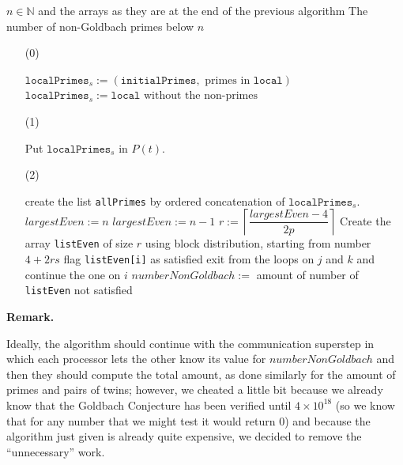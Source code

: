 \documentclass[a4paper,11pt]{article}
\newcommand{\N}{\mathbb{N}}
\begin{document}
\begin{algorithm}[H]
\begin{algorithmic}
\REQUIRE $n \in \N$ and the arrays as they are at the end of the previous algorithm
\ENSURE The number of non-Goldbach primes below $n$
\end{algorithmic}

\begin{enumerate}
\item[(0)] \begin{algorithmic}
\STATE $\texttt{localPrimes}_s := (\texttt{initialPrimes},\mbox{ primes in }\texttt{local})$
\ELSE
\STATE $\texttt{localPrimes}_s := \texttt{local} \mbox{ without the non-primes}$
\ENDIF
\end{algorithmic}

\item[(1)] \begin{algorithmic}
\STATE Put $\texttt{localPrimes}_s$ in $P(t)$.
\ENDFOR
\end{algorithmic}

\item[(2)] \begin{algorithmic}
\STATE create the list \texttt{allPrimes} by ordered concatenation of $\texttt{localPrimes}_s$.
\STATE $largestEven := n$
\ELSE
\STATE $largestEven := n-1$
\ENDIF
\STATE
\STATE $r := \left\lceil \dfrac{largestEven-4}{2p} \right\rceil$
\STATE
\STATE Create the array \verb|listEven| of size $r$ using block distribution, starting from number $4+2rs$
\STATE
{}
\STATE flag \texttt{listEven[i]} as satisfied
\STATE exit from the loops on $j$ and $k$ and continue the one on $i$
\ENDIF
\ENDFOR
\ENDFOR
\ENDFOR
\STATE
\STATE $numberNonGoldbach :=$ amount of number of \texttt{listEven} not satisfied
\end{algorithmic}
\end{enumerate}
\end{algorithm}


\textbf{Remark.} 

Ideally, the algorithm should continue with the communication superstep in which each processor lets the other know its value for $numberNonGoldbach$ and then they should compute the total amount, as done similarly for the amount of primes and pairs of twins; however, we cheated a little bit because we already know that the Goldbach Conjecture has been verified until $ 4 \times 10^{18}$ (so we know that for any number that we might test it would return 0) and because the algorithm just given is already quite expensive, we decided to remove the ``unnecessary'' work.
\end{document}
